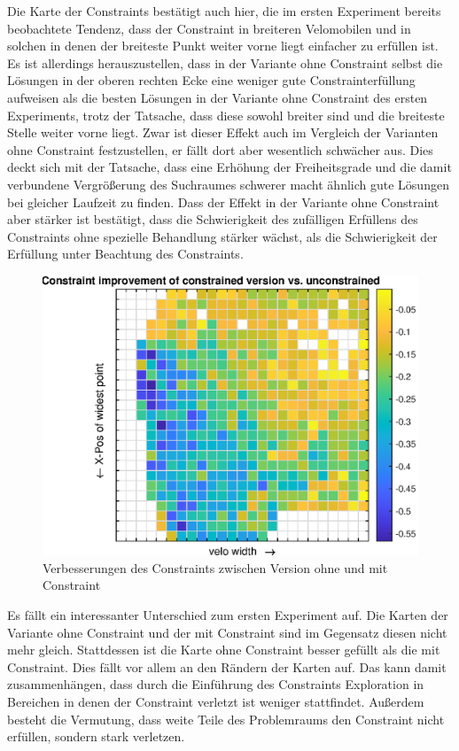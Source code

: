 Die Karte der Constraints bestätigt auch hier, die im ersten Experiment bereits beobachtete Tendenz, dass der Constraint in breiteren Velomobilen und in solchen in denen der breiteste Punkt weiter vorne liegt einfacher zu erfüllen ist.
Es ist allerdings herauszustellen, dass in der Variante ohne Constraint selbst die Lösungen in der oberen rechten Ecke eine weniger gute Constrainterfüllung aufweisen als die besten Lösungen in der Variante ohne Constraint des ersten Experiments, trotz der Tatsache, dass diese sowohl breiter sind und die breiteste Stelle weiter vorne liegt.
Zwar ist dieser Effekt auch im Vergleich der Varianten ohne Constraint festzustellen, er fällt dort aber wesentlich schwächer aus.
Dies deckt sich mit der Tatsache, dass eine Erhöhung der Freiheitsgrade und die damit verbundene Vergrößerung des Suchraumes schwerer macht ähnlich gute Lösungen bei gleicher Laufzeit zu finden.
Dass der Effekt in der Variante ohne Constraint aber stärker ist bestätigt, dass die Schwierigkeit des zufälligen Erfüllens des Constraints ohne spezielle Behandlung stärker wächst, als die Schwierigkeit der Erfüllung unter Beachtung des Constraints.

\begin{figure}[h]
	\centering
	\includegraphics[width=.7\linewidth]{bilder/6pt500Samples/constraintImprovements}
	\caption{Verbesserungen des Constraints zwischen Version ohne und mit Constraint}
	\label{fig:2ndmapConCompare}
\end{figure}

Es fällt ein interessanter Unterschied zum ersten Experiment auf.
Die Karten der Variante ohne Constraint und der mit Constraint sind im Gegensatz diesen nicht mehr gleich.
Stattdessen ist die Karte ohne Constraint besser gefüllt als die mit Constraint.
Dies fällt vor allem an den Rändern der Karten auf.
Das kann damit zusammenhängen, dass durch die Einführung des Constraints Exploration in Bereichen in denen der Constraint verletzt ist weniger stattfindet.
Außerdem besteht die Vermutung, dass weite Teile des Problemraums den Constraint nicht erfüllen, sondern stark verletzen.

